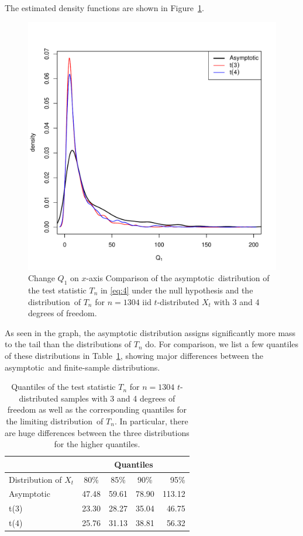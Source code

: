 \documentclass[11pt,a4]{amsart}
\newcommand{\red}{\color{darkred}}
\newcommand{\asy}{asymptotic}
\newcommand{\ds}{distribution}
\newcommand{\1}{{\mathbf 1}}
\begin{document}
The estimated density functions are shown in Figure~\ref{fig:Q1_distr}.
\begin{figure}[htb!]
  \centering
  \includegraphics[width=\textwidth]{Hoga_AsymptoticDistribution.pdf}
  \caption{{\red Change $Q_1$ on $x$-axis} Comparison of the \asy\ distribution of the test statistic $T_n$ in \eqref{eq:4} under the null hypothesis 
and the \ds\ of $T_n$ for $n=1304$ iid $t$-distributed $X_t$ with 3 and 4 degrees of freedom.}
  \label{fig:Q1_distr}
\end{figure}
As seen in the graph, the asymptotic distribution 
assigns significantly more mass to the tail than the \ds s of $T_n$ do. For comparison, we list a few quantiles of these \ds s in
Table~\ref{tab:HogaAsymptotic}, showing major differences between the \asy\ and finite-sample \ds s.
\begin{table}[htb!]
  \centering
  \begin{tabular}{l|c|c|c|r}
    & \multicolumn{4}{c}{Quantiles} \\[2mm]
    \hline
    Distribution of $X_t$& 80\% & 85\% & 90\% & 95\% \\
    \hline
    Asymptotic & 47.48 & 59.61 & 78.90 & 113.12 \\
    t(3)  & 23.30 & 28.27 & 35.04 & 46.75 \\
    t(4)  & 25.76 & 31.13 & 38.81 & 56.32\\[2mm]
  \end{tabular}
  \caption{Quantiles of the test statistic $T_n$ for $n=1304$ $t$-distributed samples with 3 and 4 degrees of freedom as well
as the corresponding quantiles for the limiting \ds\ of $T_n$. In particular, there are huge differences between the three \ds s  
for the higher quantiles. 
    }
  \label{tab:HogaAsymptotic}
\end{table}
\end{document}
